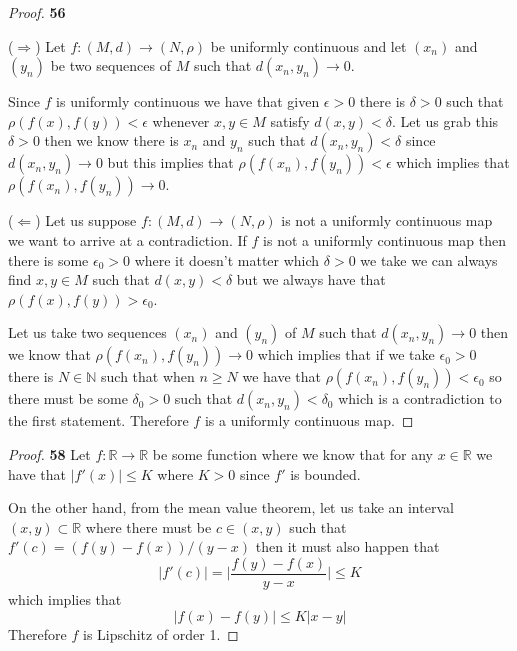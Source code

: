 \documentclass[11pt]{article}
\newcommand{\N}{\mathbb{N}}
\newcommand{\R}{\mathbb{R}}
\theoremstyle{definition}
\begin{document}
    \begin{proof}{\textbf{56}}

        ($\Rightarrow$) Let $f:(M,d) \to (N, \rho)$ be uniformly continuous
        and let $(x_n)$ and $(y_n)$ be two sequences of $M$ such that
        $d(x_n, y_n) \to 0$.
        
        Since $f$ is uniformly continuous we have that given $\epsilon > 0$
        there is $\delta > 0$ such that $\rho(f(x), f(y)) < \epsilon$
        whenever $x,y \in M$ satisfy $d(x,y) < \delta$. Let us grab this
        $\delta > 0$ then we know there is $x_n$ and $y_n$ such that
        $d(x_n, y_n) < \delta$ since $d(x_n, y_n) \to 0$ but this implies that
        $\rho(f(x_n), f(y_n)) < \epsilon$ which implies that
        $\rho(f(x_n), f(y_n)) \to 0$.

        ($\Leftarrow$)
        Let us suppose $f:(M,d) \to (N, \rho)$ is not a uniformly continuous
        map we want to arrive at a contradiction. If $f$ is not a uniformly
        continuous map then there is some $\epsilon_0 > 0$ where it doesn't
        matter which $\delta > 0$ we take we can always find $x,y \in M$
        such that $d(x,y) < \delta$ but we always have that
        $\rho(f(x),f(y)) > \epsilon_0$.

        Let us take two sequences $(x_n)$ and $(y_n)$ of $M$ such that
        $d(x_n, y_n) \to 0$ then we know that 
        $\rho(f(x_n), f(y_n)) \to 0$ which implies that if we take
        $\epsilon_0 > 0$ there is $N \in\N$ such that when $n \geq N$
        we have that  $\rho(f(x_n), f(y_n)) < \epsilon_0$ 
        so there must be some $\delta_0 > 0$ such that
        $d(x_n, y_n) < \delta_0$ which is a contradiction to the first
        statement. Therefore $f$ is a uniformly continuous map.
    \end{proof}
    \cleardoublepage
    \begin{proof}{\textbf{58}}
        Let $f:\R \to \R$ be some function where we know that for any
        $x \in \R$ we have that $|f'(x)| \leq K$ where $K > 0$ since $f'$ is
        bounded.
        
        On the other hand, from the mean value theorem, let us take an interval
        $(x,y) \subset \R$ where there must be $c \in (x,y)$ such that
        $f'(c) = (f(y) - f(x))/(y-x)$ then it must also happen that
        $$|f'(c)| = \bigg|\frac{f(y) - f(x)}{y-x}\bigg| \leq K$$
        which implies that
        $$|f(x) - f(y)| \leq K|x -y|$$
        Therefore $f$ is Lipschitz of order 1.
    \end{proof}
\end{document}
